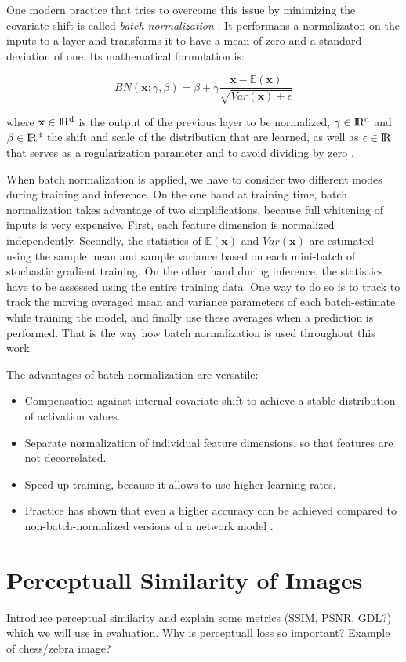 One modern practice that tries to overcome this issue by minimizing the covariate shift is called \textit{batch normalization} \parencite{batchnorm}. It performans a normalizaton on the inputs to a layer and transforms it to have a mean of zero and a standard deviation of one. Its mathematical formulation is:

\begin{equation} \label{eq:bn}
  BN(\textbf{x}; \gamma, \beta) = \beta + \gamma \frac{\textbf{x} - \mathbb{E}(\textbf{x})}{\sqrt{Var(\textbf{x}) + \epsilon}}
\end{equation}

where $ \textbf{x} \in \rm I\!R^d $ is the output of the previous layer to be normalized, $\gamma \in \rm I\!R^d $ and $\beta \in \rm I\!R^d $ the shift and scale of the distribution that are learned, as well as $\epsilon \in \rm I\!R $ that serves as a regularization parameter and to avoid dividing by zero \parencite{rnn-batchnorm}.

When batch normalization is applied, we have to consider two different modes during training and inference. On the one hand at training time, batch normalization takes advantage of two simplifications, because full whitening of inputs is very expensive. First, each feature dimension is normalized independently. Secondly, the statistics of $ \mathbb{E}(\textbf{x}) $ and $ Var(\textbf{x}) $ are estimated using the sample mean and sample variance based on each mini-batch of stochastic gradient training. On the other hand during inference, the statistics have to be assessed using the entire training data. One way to do so is to track to track the moving averaged mean and variance parameters of each batch-estimate while training the model, and finally use these averages when a prediction is performed. That is the way how batch normalization is used throughout this work.

The advantages of batch normalization are versatile:

\begin{itemize}
\item Compensation against internal covariate shift to achieve a stable distribution of activation values.
\item Separate normalization of individual feature dimensions, so that features are not decorrelated.
\item Speed-up training, because it allows to use higher learning rates.
\item Practice has shown that even a higher accuracy can be achieved compared to non-batch-normalized versions of a network model \parencite[p. 7]{batchnorm}.
\end{itemize}


\section{Perceptuall Similarity of Images}

Introduce perceptual similarity and explain some metrics (SSIM, PSNR, GDL?) which we will use in evaluation.
Why is perceptuall loss so important? Example of chess/zebra image?

